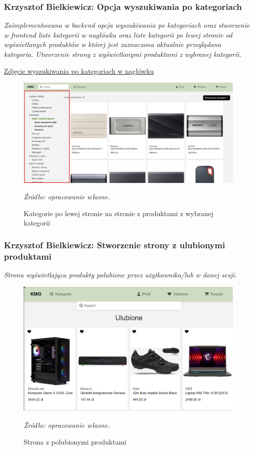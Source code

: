 \documentclass[12pt,a4paper,oneside]{article}
\theoremstyle{definition}
\numberwithin{equation}{section}
\begin{document}
    
\subsubsection{Krzysztof Bielkiewicz: Opcja wyszukiwania po kategoriach}
\label{1.3.4}
    \textit{Zaimplementowana w backend opcja wyszukiwania po kategoriach
     oraz stworzenie w frontend liste kategorii w nagłówku
      oraz liste kategorii po lewej stronie od wyświetlanych produktów w której jest zaznaczona
      aktualnie przeglądana kategoria. Utworzenie strony z wyświetlanymi produktami z wybranej kategorii.}
    \begin{center}
        \hyperref[header-categories]{Zdjęcie wyszukiwania po kategoriach w nagłówku}
    \end{center}

    \begin{figure}[H]
        \centering
        \includegraphics[width=0.8\columnwidth]{images/krzysztofBImages/lewe-kategorie.png}
        \caption{Kategorie po lewej stronie na stronie z produktami z wybranej kategorii}
        \emph{Źródło: opracowanie własne.}
    \end{figure}


\subsubsection{Krzysztof Bielkiewicz: Stworzenie strony z ulubionymi produktami}
\label{1.3.5}
\textit{Strona wyświetlająca produkty polubione przez użytkownika/lub w danej sesji.}

\begin{figure}[H]
    \centering
    \includegraphics[width=0.8\columnwidth]{images/krzysztofBImages/strona-ulubione.png}
    \caption{Strona z polubionymi produktami}
    \emph{Źródło: opracowanie własne.}
\end{figure}
\end{document}
